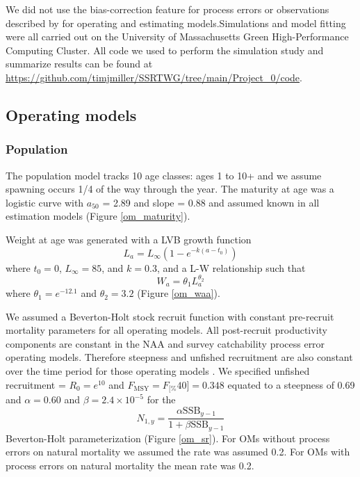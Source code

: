 \documentclass[
  12pt,
]{article}
\newcommand{\Fmsy}{\ensuremath{F_{\text{MSY}}}\xspace}
\newcommand{\Fspr}[1]{\ensuremath{F_{\text{{#1}\%}}}\xspace}
\begin{document}
We did not use the bias-correction feature for process errors or
observations described by \citet{stockmiller21} for operating and
estimating models.Simulations and model fitting were all carried out on
the University of Massachusetts Green High-Performance Computing
Cluster. All code we used to perform the simulation study and summarize
results can be found at
\url{https://github.com/timjmiller/SSRTWG/tree/main/Project_0/code}.

\hypertarget{operating-models}{%
\subsection*{Operating models}\label{operating-models}}

\hypertarget{population}{%
\subsubsection*{Population}\label{population}}

The population model tracks 10 age classes: ages 1 to 10+ and we assume
spawning occurs 1/4 of the way through the year. The maturity at age was
a logistic curve with \(a_{50}\) = 2.89 and slope = 0.88 and assumed
known in all estimation models (Figure \ref{om_maturity}).

Weight at age was generated with a LVB growth function \[
L_a = L_{\infty}\left(1 - e^{-k(a - t_0)}\right)
\] where \(t_0 = 0\), \(L_\infty = 85\), and \(k = 0.3\), and a L-W
relationship such that \[
W_a = \theta_1 L_a^{\theta_2}
\] where \(\theta_1 = e^{-12.1}\) and \(\theta_2 = 3.2\) (Figure
\ref{om_waa}).

We assumed a Beverton-Holt stock recruit function with constant
pre-recruit mortality parameters for all operating models. All
post-recruit productivity components are constant in the NAA and survey
catchability process error operating models. Therefore steepness and
unfished recruitment are also constant over the time period for those
operating models \citep{millerbrooks21}. We specified unfished
recruitment = \(R_0 = e^{10}\) and \(\Fmsy = \Fspr[40] = 0.348\) equated
to a steepness of 0.69 and \(\alpha=0.60\) and
\(\beta = 2.4 \times 10^{-5}\) for the \[
N_{1,y} = \frac{\alpha \text{SSB}_{y-1}}{1 + \beta \text{SSB}_{y-1}} 
\] Beverton-Holt parameterization (Figure \ref{om_sr}). For OMs without
process errors on natural mortality we assumed the rate was assumed 0.2.
For OMs with process errors on natural mortality the mean rate was 0.2.
\end{document}
